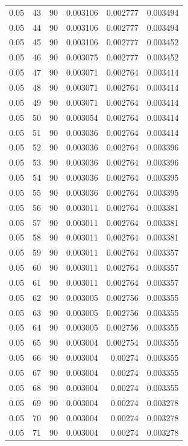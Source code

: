 \begin{tabular}{rrrrrr}
0.05 & 43 & 90 & 0.003106 & 0.002777 & 0.003494 \\
0.05 & 44 & 90 & 0.003106 & 0.002777 & 0.003494 \\
0.05 & 45 & 90 & 0.003106 & 0.002777 & 0.003452 \\
0.05 & 46 & 90 & 0.003075 & 0.002777 & 0.003452 \\
0.05 & 47 & 90 & 0.003071 & 0.002764 & 0.003414 \\
0.05 & 48 & 90 & 0.003071 & 0.002764 & 0.003414 \\
0.05 & 49 & 90 & 0.003071 & 0.002764 & 0.003414 \\
0.05 & 50 & 90 & 0.003054 & 0.002764 & 0.003414 \\
0.05 & 51 & 90 & 0.003036 & 0.002764 & 0.003414 \\
0.05 & 52 & 90 & 0.003036 & 0.002764 & 0.003396 \\
0.05 & 53 & 90 & 0.003036 & 0.002764 & 0.003396 \\
0.05 & 54 & 90 & 0.003036 & 0.002764 & 0.003395 \\
0.05 & 55 & 90 & 0.003036 & 0.002764 & 0.003395 \\
0.05 & 56 & 90 & 0.003011 & 0.002764 & 0.003381 \\
0.05 & 57 & 90 & 0.003011 & 0.002764 & 0.003381 \\
0.05 & 58 & 90 & 0.003011 & 0.002764 & 0.003381 \\
0.05 & 59 & 90 & 0.003011 & 0.002764 & 0.003357 \\
0.05 & 60 & 90 & 0.003011 & 0.002764 & 0.003357 \\
0.05 & 61 & 90 & 0.003011 & 0.002764 & 0.003357 \\
0.05 & 62 & 90 & 0.003005 & 0.002756 & 0.003355 \\
0.05 & 63 & 90 & 0.003005 & 0.002756 & 0.003355 \\
0.05 & 64 & 90 & 0.003005 & 0.002756 & 0.003355 \\
0.05 & 65 & 90 & 0.003004 & 0.002754 & 0.003355 \\
0.05 & 66 & 90 & 0.003004 & 0.00274 & 0.003355 \\
0.05 & 67 & 90 & 0.003004 & 0.00274 & 0.003355 \\
0.05 & 68 & 90 & 0.003004 & 0.00274 & 0.003355 \\
0.05 & 69 & 90 & 0.003004 & 0.00274 & 0.003278 \\
0.05 & 70 & 90 & 0.003004 & 0.00274 & 0.003278 \\
0.05 & 71 & 90 & 0.003004 & 0.00274 & 0.003278 \\

\end{tabular}
